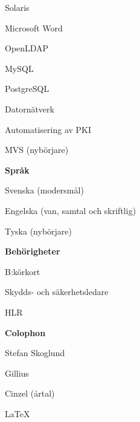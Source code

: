 \documentclass[a4paper,swedish,10pt]{article}
\begin{document}
\begin{minipage}[t]{0.27\textwidth}
\begin{description}[nosep]
  \item Solaris
  \item Microsoft Word
  \item OpenLDAP
  \item MySQL
  \item PostgreSQL
  \item Datornätverk
  \item Automatisering av PKI
  \item MVS (nybörjare)
  \end{description}
  \vspace{0.5cm}
  \textbf{Språk}
  \begin{description}[nosep,itemsep=0.1ex]
    \raggedleft\small%
  \item Svenska (modersmål)
  \item Engelska (van, samtal och skriftlig)
  \item Tyska (nybörjare)
  \end{description}
  \vspace{0.5cm}
  \textbf{Behörigheter}
  \begin{description}[nosep]
    \raggedleft\setlength\itemsep{0.1ex}\small%
  \item B:körkort
  \item Skydds- och säkerhetsledare
  \item HLR
  \end{description}
  \vspace{5cm}
  \textbf{Colophon}
  \begin{description}[nosep]
    \raggedleft\setlength\itemsep{0.1ex}\small%
  \item Stefan Skoglund {}
  \item Gillius
  \item Cinzel (årtal)
  \item \LaTeX%
  \end{description}
\end{minipage}

\end{document}
